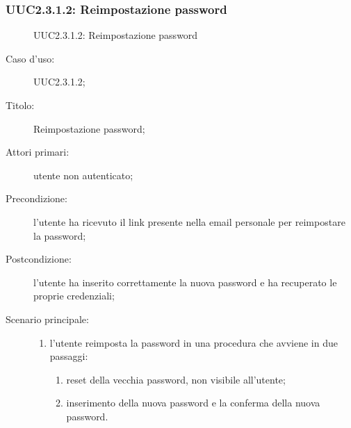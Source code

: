 \documentclass[../../../analisi-dei-requisiti.tex]{subfiles}
\begin{document}
\subsubsection{UUC2.3.1.2: Reimpostazione password}%
\label{subs:UUC2.3.1.2}

\begin{figure}[H]
  \centering
  \caption{UUC2.3.1.2: Reimpostazione password}%
  \label{fig:uuc2_3_1_2}
\end{figure}

\begin{description}
  \item[Caso d’uso:] UUC2.3.1.2;
  \item[Titolo:] Reimpostazione password;
  \item[Attori primari:] utente non autenticato;
  \item[Precondizione:] l'utente ha ricevuto il link presente nella email personale per reimpostare la password;
  \item[Postcondizione:] l'utente ha inserito correttamente la nuova password e ha recuperato le proprie credenziali;
  \item[Scenario principale:]
        \begin{enumerate}
          \item l'utente reimposta la password in una procedura che avviene in due passaggi:
                \begin{enumerate}
                  \item reset della vecchia password, non visibile all'utente;
                  \item inserimento della nuova password e la conferma della nuova password.
                \end{enumerate}
        \end{enumerate}
\end{description}
\end{document}
